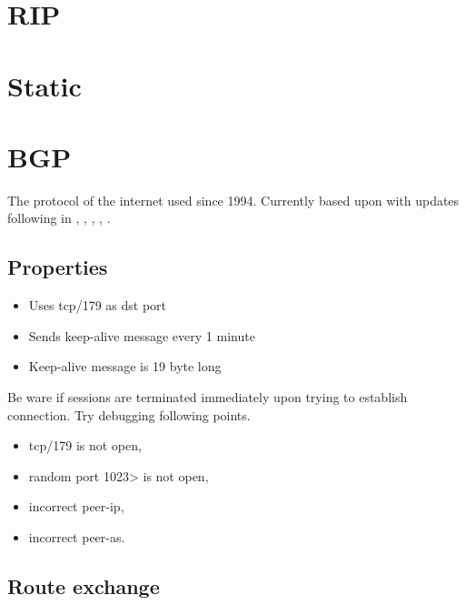 
\newpage

\section{RIP}

\newpage

\section{Static}

\newpage

\section{BGP}


The protocol of the internet used since 1994.\cite{wiki:Border_Gateway_Protocol}
Currently based upon  with updates following in  , , , , .

\subsection{Properties}

\begin{itemize}
    \item Uses tcp/179 as \gls{dst} port
    \item Sends keep-alive message every 1 minute
    \item Keep-alive message is 19 byte long
\end{itemize}

Be ware if sessions are terminated immediately upon trying to establish connection. Try debugging following points.

\begin{itemize}
    \item tcp/179 is not open,
    \item random port 1023> is not open,
    \item incorrect peer-ip,
    \item incorrect peer-as.
\end{itemize}

\subsection{Route exchange}

